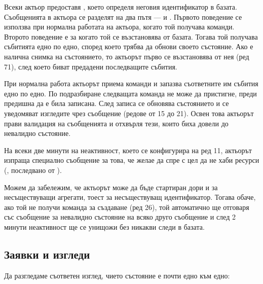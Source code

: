 Всеки актьор предоставя , което определя неговия идентификатор в базата. Съобщенията в актьора се разделят на два пътя —  и . Първото поведение се използва при нормална работата на актьора, когато той получава команди. Второто поведение е за когато той се възстановява от базата. Тогава той получава събитията едно по едно, според което трябва да обнови своето състояние. Ако е налична снимка на състоянието, то актьорът първо се възстановява от нея (ред 71), след което биват предадени последващите събития.

При нормална работа актьорът приема команди и запазва съответните им събития едно по едно. По подразбиране следващата команда не може да пристигне, преди предишна да е била записана. След записа се обновява състоянието и се уведомяват изгледите чрез  съобщение (редове от 15 до 21). Освен това актьорът прави валидация на съобщенията и отхвърля тези, които биха довели до невалидно състояние.

На всеки две минути на неактивност, което се конфигурира на ред 11, актьорът изпраща специално съобщение за това, че желае да спре с цел да не хаби ресурси (, последвано от ).

Можем да забележим, че актьорът може да бъде стартиран дори и за несъществуващи агрегати, тоест за несъществуващ идентификатор. Тогава обаче, ако той не получи команда за създаване (ред 26), той автоматично ще отговаря със съобщение за невалидно състояние на всяко друго съобщение и след 2 минути неактивност ще се унищожи без никакви следи в базата.

\subsection{Заявки и изгледи}

Да разгледаме съответен изглед, чието състояние е почти едно към едно:

